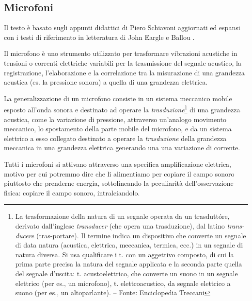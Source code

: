 
\clearpage

\begin{refsection}

\section{Microfoni}

Il testo è basato sugli appunti didattici di Piero Schiavoni \autocite{ps:01}
aggiornati ed espansi con i testi di riferimento in letteratura di John Eargle \autocite{Eargle_2005}
e Ballou \autocite{Ballou_2009}.

Il microfono è uno strumento utilizzato per trasformare vibrazioni acustiche in
tensioni o correnti elettriche variabili per la trasmissione del segnale acustico,
la registrazione, l'elaborazione e la correlazione tra la
misurazione di una grandezza acustica (es. la pressione sonora) a quella
di una grandezza elettrica.

La generalizzazione di un microfono consiste in un sistema meccanico mobile esposto
all’onda sonora e destinato ad operare la \emph{trasduzione}\footnote{La
trasformazione della natura di un segnale operata da un trasduttóre,
derivato dall'inglese \emph{transducer} (che opera una trasduzione), dal latino
\emph{trans-ducere} (tras-portare). Il termine indica un dispositivo che converte
un segnale di data natura (acustica, elettrica, meccanica, termica, ecc.) in un
segnale di natura diversa. Si usa qualificare i t. con un aggettivo composto,
di cui la prima parte precisa la natura del segnale applicata e la seconda
parte quella del segnale d'uscita: t. acustoelettrico, che converte un suono in
un segnale elettrico (per es., un microfono), t. elettroacustico, da segnale
elettrico a suono (per es., un altoparlante). – Fonte: Enciclopedia Treccani}
di una grandezza acustica, come la variazione di pressione, attraverso un'analogo
movimento meccanico, lo spostamento della parte mobile del microfono, e da un sistema
elettrico a esso collegato destinato a operare la \emph{trasduzione} della
grandezza meccanica in una grandezza elettrica generando una una variazione di
corrente.

Tutti i microfoni si attivano attraverso una specifica amplificazione elettrica,
motivo per cui potremmo dire che li alimentiamo per copiare il campo sonoro
piuttosto che prenderne energia, sottolineando la peculiarità dell'osservazione
fisica: copiare il campo sonoro, intralciandolo.


\end{refsection}
